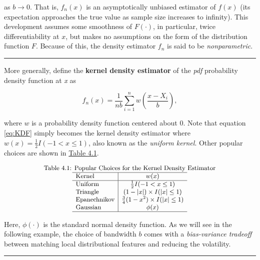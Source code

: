 \documentclass[]{book}
\theoremstyle{definition}
\theoremstyle{definition}
\theoremstyle{definition}
\theoremstyle{remark}
\begin{document}
as \(b\rightarrow 0\). That is, \(f_n(x)\) is an asymptotically unbiased
estimator of \(f(x)\) (its expectation approaches the true value as
sample size increases to infinity). This development assumes some
smoothness of \(F(\cdot)\), in particular, twice differentiability at
\(x\), but makes no assumptions on the form of the distribution function
\(F\). Because of this, the density estimator \(f_n\) is said to be
\emph{nonparametric}.

\begin{center}\rule{0.5\linewidth}{\linethickness}\end{center}

More generally, define the \textbf{kernel density estimator} of the
\emph{pdf}{ probability density function} at \emph{x} as

\begin{equation} 
  f_n(x) = \frac{1}{nb} \sum_{i=1}^n w\left(\frac{x-X_i}{b}\right) ,
  \label{eq:kernelDens}
\end{equation}

where \(w\) is a probability density function centered about 0. Note
that equation \eqref{eq:KDF} simply becomes the kernel density estimator
where \(w(x) = \frac{1}{2}I(-1 < x \le 1)\), also known as the
\emph{uniform kernel}. Other popular choices are shown in
\protect\hyperlink{tab:41}{Table 4.1}.

\[
{\small
\begin{matrix}
\text{Table 4.1: Popular Choices for the Kernel Density Estimator}\\
\begin{array}{l|cc}
\hline
\text{Kernel} &  w(x) \\
\hline
\text{Uniform } &  \frac{1}{2}I(-1 < x \le 1) \\
\text{Triangle} &  (1-|x|)\times I(|x| \le 1) \\
\text{Epanechnikov} & \frac{3}{4}(1-x^2) \times I(|x| \le 1) \\
\text{Gaussian} & \phi(x) \\
\hline
\end{array}\end{matrix}
}
\]

Here, \(\phi(\cdot)\) is the standard normal density function. As we
will see in the following example, the choice of bandwidth \(b\) comes
with a \emph{bias-variance tradeoff} between matching local
distributional features and reducing the volatility.

\begin{center}\rule{0.5\linewidth}{\linethickness}\end{center}
\end{document}
